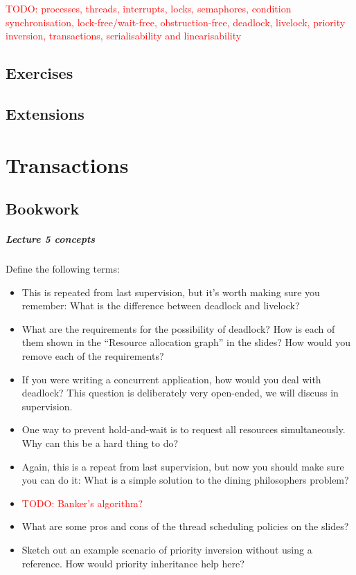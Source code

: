 \documentclass[12pt,a4paper,oneside,openright]{report}
\newcommand{\question}[2]{\paragraph{#1} #2}
\newcommand{\todo}[1]{\textcolor{red}{TODO: #1}}
\begin{document}
\todo{processes, threads, interrupts, locks, semaphores, condition
  synchronisation, lock-free/wait-free, obstruction-free, deadlock,
  livelock, priority inversion, transactions, serialisability and
  linearisability}

\section{Exercises}

\section{Extensions}


\chapter{Transactions}

\section{Bookwork}

\question{Lecture 5 concepts}{Define the following terms:
  \begin{itemize}
  \item This is repeated from last supervision, but it's worth making
    sure you remember: What is the difference between deadlock and
    livelock?
  \item What are the requirements for the possibility of deadlock? How
    is each of them shown in the ``Resource allocation graph'' in the
    slides? How would you remove each of the requirements?
  \item If you were writing a concurrent application, how would you
    deal with deadlock? This question is deliberately very open-ended,
    we will discuss in supervision.
  \item One way to prevent hold-and-wait is to request all resources
    simultaneously. Why can this be a hard thing to do?
  \item Again, this is a repeat from last supervision, but now you
    should make sure you can do it: What is a simple solution to the
    dining philosophers problem?
  \item \todo{Banker's algorithm?}
  \item What are some pros and cons of the thread scheduling policies
    on the slides?
  \item Sketch out an example scenario of priority inversion without
    using a reference. How would priority inheritance help here?
  \end{itemize}
}
\end{document}
